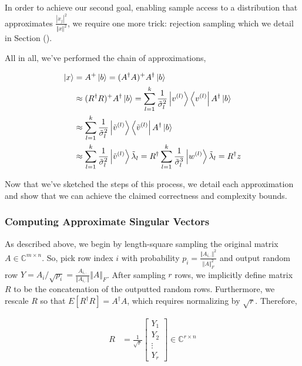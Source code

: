 \documentclass[11pt]{article}
\newcommand\0{\mathbf{0}}
\newcommand\CC{\mathbb{C}}
\newcommand\<{\langle}
\renewcommand\>{\rangle}
\begin{document}
In order to achieve our second goal, enabling sample access to a distribution that approximates $\frac{|x_j|^2}{\Vert x \Vert^2}$, we require one more trick: rejection sampling which we detail in Section ().

All in all, we've performed the chain of approximations,

\begin{align*}
	\ket{x} &= A^+ \ket{b} = (A^\dag A)^+ A^\dag \ket{b}\\
	&\approx (R^\dag R)^+ A^\dag \ket{b} = \sum_{l = 1}^k \frac{1}{\tilde{\sigma}_l^2} \ket{v^{(l)}} \bra{v^{(l)}} A^\dag \ket{b}\\
	&\approx \sum_{l = 1}^k \frac{1}{\tilde{\sigma}_l^2} \ket{\tilde{v}^{(l)}} \bra{\tilde{v}^{(l)}} A^\dag \ket{b}\\ %
	&\approx \sum_{l = 1}^k \frac{1}{\tilde{\sigma}_l^2} \ket{\tilde{v}^{(l)}} \tilde{\lambda}_l = R^\dag \sum_{l = 1}^k \frac{1}{\tilde{\sigma}_l^3} \ket{w^{(l)}} \tilde{\lambda}_l = R^\dag z
\end{align*}


Now that we've sketched the steps of this process, we detail each approximation and show that we can achieve the claimed correctness and complexity bounds.

\subsubsection{Computing Approximate Singular Vectors}

As described above, we begin by length-square sampling the original matrix $A \in \CC^{m \times n }$. So, pick row index $i$ with probability $p_i = \frac{\Vert A_{i, \cdot}\Vert^2}{\Vert A \Vert_F^2}$ and output random row $Y = A_i / \sqrt{p_i} = \frac{A_{i, \cdot}}{\Vert A_{i, \cdot}\Vert}\Vert A\Vert_F$. After sampling $r$ rows, we implicitly define matrix $R$ to be the concatenation of the outputted random rows. Furthermore, we rescale $R$ so that $E[R^{\dag} R] = A^\dag A$, which requires normalizing by $\sqrt{r}$. Therefore,

\begin{align*}
R &= \frac{1}{\sqrt{r}} \begin{bmatrix}
Y_1 \\
Y_2 \\
\vdots \\
Y_r
\end{bmatrix} \in \CC^{r \times n}
\end{align*}
\end{document}
